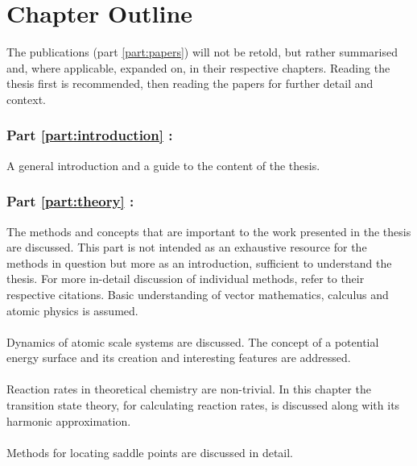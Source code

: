 \section{Chapter Outline}
\label{sec:chapters}

The publications (part \ref{part:papers}) will not be retold, but rather summarised and, where applicable, expanded on, in their respective chapters.
Reading the thesis first is recommended, then reading the papers for further detail and context.

\subsubsection{Part \ref{part:introduction} : }
A general introduction and a guide to the content of the thesis.

\subsubsection{Part \ref{part:theory} : }
The methods and concepts that are important to the work presented in the thesis are discussed.
This part is not intended as an exhaustive resource for the methods in question but more as an introduction, sufficient to understand the thesis.
For more in-detail discussion of individual methods, refer to their respective citations.
Basic understanding of vector mathematics, calculus and atomic physics is assumed.

\paragraph{}
Dynamics of atomic scale systems are discussed.
The concept of a potential energy surface and its creation and interesting features are addressed.

\paragraph{}
Reaction rates in theoretical chemistry are non-trivial.
In this chapter the transition state theory, for calculating reaction rates, is discussed along with its harmonic approximation.

\paragraph{}
Methods for locating saddle points are discussed in detail.

